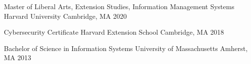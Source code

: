 
\begin{cventries}
  \cventry
    {Master of Liberal Arts, Extension Studies, Information Management Systems} %
    {Harvard University} %
    {Cambridge, MA} %
    {2020} %
    {}

  \cventry
    {Cybersecurity Certificate} %
    {Harvard Extension School} %
    {Cambridge, MA} %
    {2018} %
    {}

  \cventry
    {Bachelor of Science in Information Systems} %
    {University of Massachusetts} %
    {Amherst, MA} %
    {2013} %
    {}
  
\end{cventries}
